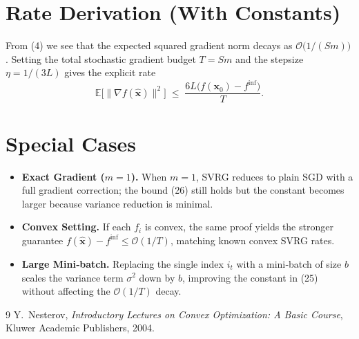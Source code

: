 \documentclass{article}
\newcommand{\EE}{\mathbb{E}}
\begin{document}
\section*{Rate Derivation (With Constants)}
From (4) we see that the expected squared gradient norm decays as $\mathcal{O}\bigl(1/(Sm)\bigr)$. Setting the total stochastic gradient budget $T=Sm$ and the stepsize $\eta=1/(3L)$ gives the explicit rate
\[
\EE\!\bigl[\|\nabla f(\hat{\mathbf{x}})\|^{2}\bigr]
\;\le\;
\frac{6L\bigl(f(\mathbf{x}_0)-f^{\inf}\bigr)}{T}.
\tag{26}
\]

\section*{Special Cases}
\begin{itemize}
\item \textbf{Exact Gradient ($m=1$).} When $m=1$, SVRG reduces to plain SGD with a full gradient correction; the bound (26) still holds but the constant becomes larger because variance reduction is minimal.
\item \textbf{Convex Setting.} If each $f_i$ is convex, the same proof yields the stronger guarantee $f(\hat{\mathbf{x}})-f^{\inf}\le \mathcal{O}(1/T)$, matching known convex SVRG rates.
\item \textbf{Large Mini‑batch.} Replacing the single index $i_t$ with a mini‑batch of size $b$ scales the variance term $\sigma^{2}$ down by $b$, improving the constant in (25) without affecting the $\mathcal{O}(1/T)$ decay.
\end{itemize}

\begin{thebibliography}{9}
Y.~Nesterov, \emph{Introductory Lectures on Convex Optimization: A Basic Course}, Kluwer Academic Publishers, 2004.
\end{thebibliography}
\end{document}
